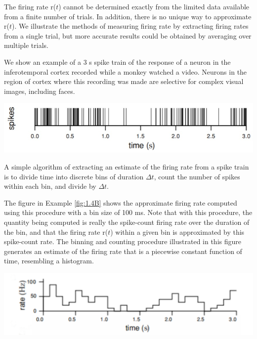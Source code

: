 \begin{ntn}
  The firing rate r($t$) cannot be determined exactly from the limited data
available from a finite number of trials. In addition, there is no unique
way to approximate r($t$).
  We illustrate the methods of measuring firing rate by extracting
  firing rates from a single trial, but more accurate results could be obtained
  by averaging over multiple trials.
  \begin{exm}
    We show an example of a $3$ s spike train of the response of a neuron in the inferotemporal cortex 
  recorded while a monkey watched a video. Neurons
  in the region of cortex where this recording was made are selective for
  complex visual images, including faces.
  \end{exm}
\end{ntn}
\begin{center}
  \label{fig:1.4A}
    \includegraphics[scale=0.3]{./png/fig_1_4A.png}
  \end{center}

\begin{alg}
  A simple algorithm of extracting an estimate of the firing rate from a spike train is to divide time into
discrete bins of duration $\Delta t$, count the number of spikes within each bin,
and divide by $\Delta t$.
\end{alg}

\begin{exm}
  \label{fig:1.4B}
  The figure in Example \ref{fig:1.4B} shows the approximate firing rate computed
using this procedure with a bin size of 100 ms. Note that with this procedure, the quantity being computed is 
really the spike-count firing rate over the duration of the bin, and that the firing rate 
r($t$) within a 
given bin is approximated by this spike-count rate. The binning and counting procedure 
illustrated in this figure 
generates an estimate of the firing rate that is a piecewise constant function of time, 
resembling a histogram.
\end{exm}

\begin{center}
  \includegraphics[scale=0.053]{./png/fig_1_4B.png}
\end{center}

